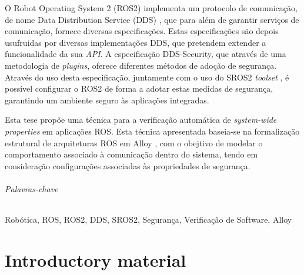 \documentclass[
  oneside,
  11pt, a4paper,
  footinclude=true,
  headinclude=true,
  cleardoublepage=empty
]{scrbook}
\begin{document}
	O Robot Operating System 2 (ROS2) implementa um protocolo de comunicação, de nome Data Distribution Service (DDS) \cite{3}, que para além de garantir serviços de comunicação, fornece diversas especificações. Estas especificações são depois usufruidas por diversas implementações DDS, que pretendem extender a funcionalidade da sua \textit{API}. A especificação DDS-Security, que através de uma metodologia de \textit{plugins}, oferece diferentes métodos de adoção de segurança. Através do uso desta especificação, juntamente com o uso do SROS2 \textit{toolset} \cite{ros-dds-integration}, é possível configurar o ROS2 de forma a adotar estas medidas de segurança, garantindo um ambiente seguro às aplicações integradas.

	Esta tese propõe uma técnica para a verificação automática de \textit{system-wide properties} em aplicações ROS. Esta técnica apresentada baseia-se na formalização estrutural de arquiteturas ROS em Alloy \cite{alloy-6}, com o obejtivo de modelar o comportamento associado à comunicação dentro do sistema, tendo em consideração configurações associadas às propriedades de segurança. 
	
	
\paragraph{Palavras-chave} Robótica, ROS, ROS2, DDS, SROS2, Segurança, Verificação de Software, Alloy


	\cleardoublepage

	\setcounter{page}{3}

	\cleardoublepage
	\tableofcontents

	\cleardoublepage
	\listoffigures



	\cleardoublepage
	\setcounter{page}{3}

\part{Introductory material}








\end{document}
